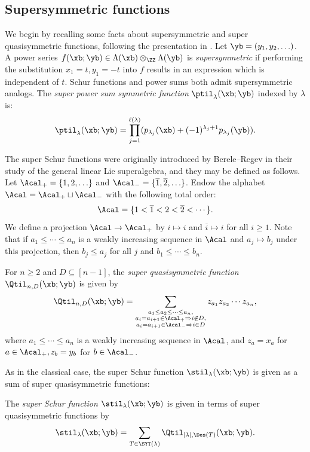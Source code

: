 \subsection{Supersymmetric functions}\label{sec:supersym-fxns}
We begin by recalling some facts about supersymmetric and super quasisymmetric functions, following the presentation in \cite{HHLRU}. Let $\yb = (y_1,y_2,\ldots)$. A power series $f(\xb;\yb) \in \Lambda(\xb) \otimes_\ZZ \Lambda(\yb)$ is \emph{supersymmetric} if performing the substitution $x_1 = t, y_1 = -t$ into $f$ results in an expression which is independent of $t$. Schur functions and power sums both admit supersymmetric analogs. The \emph{super power sum symmetric function} $\ptil_\lambda(\xb;\yb)$ indexed by $\lambda$ is:
\[
\ptil_\lambda(\xb;\yb) = \prod_{j=1}^{\ell(\lambda)} (p_{\lambda_j}(\xb) + (-1)^{\lambda_j+1}p_{\lambda_j}(\yb)).
\]

The super Schur functions were originally introduced by Berele--Regev \cite{BReg} in their study of the general linear Lie superalgebra, and they may be defined as follows. Let $\Acal_+ = \{ 1, 2, \ldots \}$ and $\Acal_- = \{ \overline{1}, \overline{2}, \ldots \}$. Endow the alphabet $\Acal = \Acal_+ \sqcup \Acal_-$ with the following total order:
\[
\Acal = \{ 1 < \overline{1} < 2 < \overline{2} < \cdots \}.
\]
We define a projection $\Acal \to \Acal_+$ by $i \mapsto i$ and $\overline{i} \mapsto i$ for all $i \ge 1$. Note that if $a_1 \le \cdots \le a_n$ is a weakly increasing sequence in $\Acal$ and $a_j \mapsto b_j$ under this projection, then $b_j \le a_j$ for all $j$ and $b_1 \le \cdots \le b_n$.
 
\begin{defi}
For $n \ge 2$ and $D \subseteq [n-1]$, the \emph{super quasisymmetric function} $\Qtil_{n,D}(\xb;\yb)$ is given by
\[
\Qtil_{n,D}(\xb;\yb) = \sum_{\substack{a_1 \le a_2 \le \cdots \le a_n, \\ a_i = a_{i+1} \in \Acal_+ \Rightarrow i \not\in D, \\ a_i = a_{i+1} \in \Acal_- \Rightarrow i \in D}} z_{a_1} z_{a_2} \cdots z_{a_n},
\]
where $a_1 \le \cdots \le a_n$ is a weakly increasing sequence in $\Acal$, and $z_a = x_a$ for $a \in \Acal_+, z_b = y_b$ for $b \in \Acal_-$.
\end{defi}
As in the classical case, the super Schur function $\stil_\lambda(\xb;\yb)$ is given as a sum of super quasisymmetric functions:
\begin{defi}\label{prop:super-s-to-q}
    The \emph{super Schur function} $\stil_\lambda(\xb;\yb)$ is given in terms of super quasisymmetric functions by
    \[
    \stil_\lambda(\xb;\yb) = \sum_{T \in \SYT(\lambda)} \Qtil_{|\lambda|,\Des(T)}(\xb;\yb).
    \]
\end{defi}

